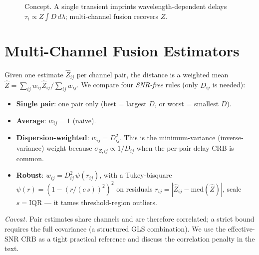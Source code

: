 \documentclass[10pt]{article}
\begin{document}
\begin{figure}[t]
\centering
{}
\caption{Concept. A single transient imprints wavelength-dependent delays
$\tau_i\propto Z\!\int\! D\,d\lambda$; multi-channel fusion recovers $Z$.}
\label{fig:concept}
\end{figure}

\section{Multi-Channel Fusion Estimators}
\label{sec:fusion}
Given one estimate $\hat{Z}_{ij}$ per channel pair, the distance is a weighted
mean $\hat{Z}=\sum_{ij} w_{ij}\hat{Z}_{ij}/\sum_{ij} w_{ij}$. We compare four
\emph{SNR-free} rules (only $D_{ij}$ is needed):
\begin{itemize}\itemsep1pt
\item \textbf{Single pair}: one pair only (best = largest $D$, or worst = smallest $D$).
\item \textbf{Average}: $w_{ij}=1$ (naive).
\item \textbf{Dispersion-weighted}: $w_{ij}=D_{ij}^2$. This is the
minimum-variance (inverse-variance) weight because
$\sigma_{Z,ij}\propto 1/D_{ij}$ when the per-pair delay CRB is common.
\item \textbf{Robust}: $w_{ij}=D_{ij}^2\,\psi(r_{ij})$, with a Tukey-bisquare
$\psi(r)=(1-(r/(c\,s))^2)^2$ on residuals $r_{ij}=|\hat Z_{ij}-\mathrm{med}(\hat Z)|$,
scale $s=\mathrm{IQR}$ --- it tames threshold-region outliers.
\end{itemize}
\emph{Caveat.} Pair estimates share channels and are therefore correlated; a
strict bound requires the full covariance (a structured GLS combination). We use
the effective-SNR CRB as a tight practical reference and discuss the
correlation penalty in the text.
\end{document}
